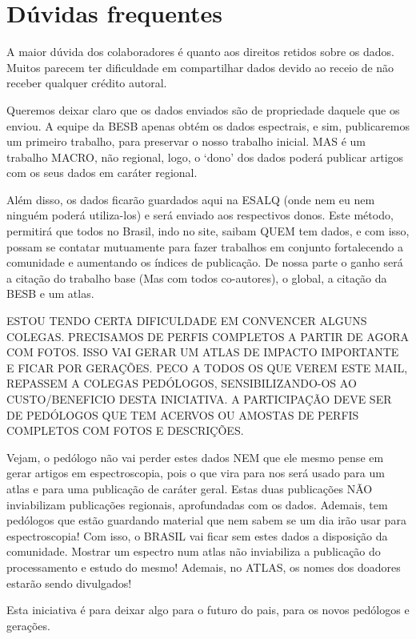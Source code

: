 \section{Dúvidas frequentes}

A maior dúvida dos colaboradores é quanto aos direitos retidos sobre os dados. Muitos parecem ter dificuldade em compartilhar dados devido ao receio de não receber qualquer crédito autoral.

Queremos deixar claro que os dados enviados são de propriedade daquele que os enviou. A equipe da BESB apenas obtém os dados espectrais, e sim, publicaremos um primeiro trabalho, para preservar o nosso trabalho inicial. MAS é um trabalho MACRO, não regional, logo, o ‘dono’ dos dados poderá publicar artigos com os seus dados em caráter regional.

Além disso, os dados ficarão guardados aqui na ESALQ (onde nem eu nem ninguém poderá utiliza-los) e será enviado aos respectivos donos. Este método, permitirá que todos no Brasil, indo no site, saibam QUEM tem dados, e com isso, possam se contatar mutuamente para fazer trabalhos em conjunto fortalecendo a comunidade e aumentando os índices de publicação. De nossa parte o ganho será a citação do trabalho base (Mas com todos co-autores), o global, a citação da BESB e um atlas.

ESTOU TENDO CERTA DIFICULDADE EM CONVENCER ALGUNS COLEGAS. PRECISAMOS DE PERFIS COMPLETOS A PARTIR DE AGORA COM FOTOS. ISSO VAI GERAR UM ATLAS DE IMPACTO IMPORTANTE E FICAR POR GERAÇÕES. PECO A TODOS OS  QUE VEREM ESTE MAIL, REPASSEM A COLEGAS PEDÓLOGOS, SENSIBILIZANDO-OS AO CUSTO/BENEFICIO DESTA INICIATIVA. A PARTICIPAÇÃO DEVE SER DE PEDÓLOGOS QUE TEM ACERVOS OU AMOSTAS DE PERFIS COMPLETOS COM FOTOS E DESCRIÇÕES.

Vejam, o pedólogo não vai perder estes dados NEM que ele mesmo pense em  gerar artigos em espectroscopia, pois o que vira para nos será usado para um atlas e para uma publicação de caráter geral. Estas duas publicações NÃO inviabilizam publicações regionais, aprofundadas com os dados. Ademais, tem pedólogos que estão guardando material que nem sabem se um dia irão usar para espectroscopia! Com isso, o BRASIL vai ficar sem estes dados a disposição da comunidade. Mostrar um espectro num atlas não inviabiliza a publicação do processamento e estudo do mesmo! Ademais, no ATLAS, os nomes dos doadores estarão sendo divulgados!
 
Esta iniciativa é para deixar algo para o futuro do pais, para os novos pedólogos e gerações.
 
